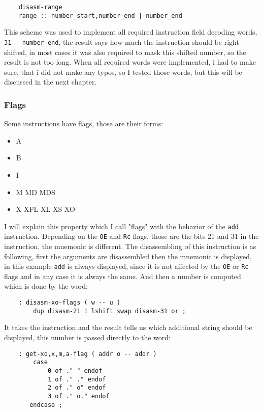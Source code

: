     \begin{verbatim}
    disasm-range
    range :: number_start,number_end | number_end
    \end{verbatim}

    This scheme was used to implement all required instruction field decoding
    words, \texttt{31 - number\_end}, the result says how much the instruction
    should be right shifted, in most cases it was also required to mask this
    shifted number, so the result is not too long. When all required words were
    implemented, i had to make sure, that i did not make any typos, so I tested
    those words, but this will be discussed in the next chapter.

    \subsubsection{Flags}

    Some instructions have flags, those are their forms:

    \begin{itemize}
    \item A
    \item B
    \item I
    \item M MD MDS
    \item X XFL XL XS XO
    \end{itemize}

    I will explain this property which I call "flags" with the behavior of the
    \texttt{add} instruction. Depending on the \texttt{OE} and \texttt{Rc}
    flags, those are the
    bits 21 and 31 in the instruction, the mnemonic is different. The
    disassembling of this instruction is as following, first the arguments are
    disassembled then the mnemonic is displayed, in this example \texttt{add} is
    always displayed, since it is not affected by the \texttt{OE} or 
    \texttt{Rc} flags and in any case it is always the same. And then a number 
    is computed which is done by the word:

    \begin{verbatim}
    : disasm-xo-flags ( w -- u )
        dup disasm-21 1 lshift swap disasm-31 or ;
    \end{verbatim}

    It takes the instruction and the result tells us which additional string
    should be displayed, this number is passed directly to the word:

    \begin{verbatim}
    : get-xo,x,m,a-flag ( addr o -- addr )
        case
            0 of ." " endof
            1 of ." ." endof
            2 of ." o" endof
            3 of ." o." endof
       endcase ;
    \end{verbatim}


